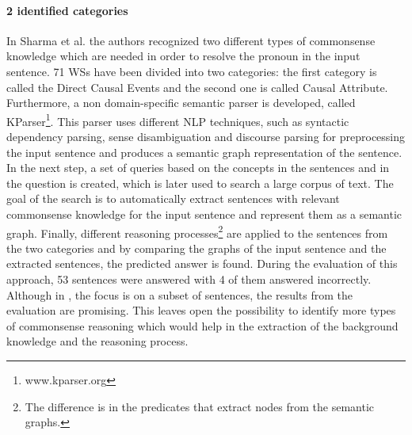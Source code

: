 \paragraph{2 identified categories}
In Sharma et al. \cite{DBLP:conf/ijcai/SharmaVAB15} the authors recognized two different types of commonsense knowledge which are needed in order to resolve the pronoun in the input sentence. 
71 WSs have been divided into two categories: the first category is called the Direct Causal Events and the second one is called Causal Attribute. Furthermore, a non domain-specific semantic parser is developed, called KParser\footnote{www.kparser.org}. This parser uses different NLP techniques, such as syntactic dependency parsing, sense disambiguation and discourse parsing for preprocessing the input sentence and produces a semantic graph representation of the sentence. In the next step, a set of queries based on the concepts in the sentences and in the question is created, which is later used to search a large corpus of text. The goal of the search is to automatically extract sentences with relevant commonsense knowledge for the input sentence and represent them as a semantic graph. Finally, different reasoning processes\footnote{The difference is in the predicates that extract nodes from the semantic graphs.} are applied to the sentences from the two categories and by comparing the graphs of the input sentence and the extracted sentences, the predicted answer is found. During the evaluation of this approach, 53 sentences were answered with 4 of them answered incorrectly. 
Although in \cite{DBLP:conf/ijcai/SharmaVAB15}, the focus is on a subset of sentences, the results from the evaluation are promising. This leaves open the possibility to identify more types of commonsense reasoning which would help in the extraction of the background knowledge and the reasoning process.

